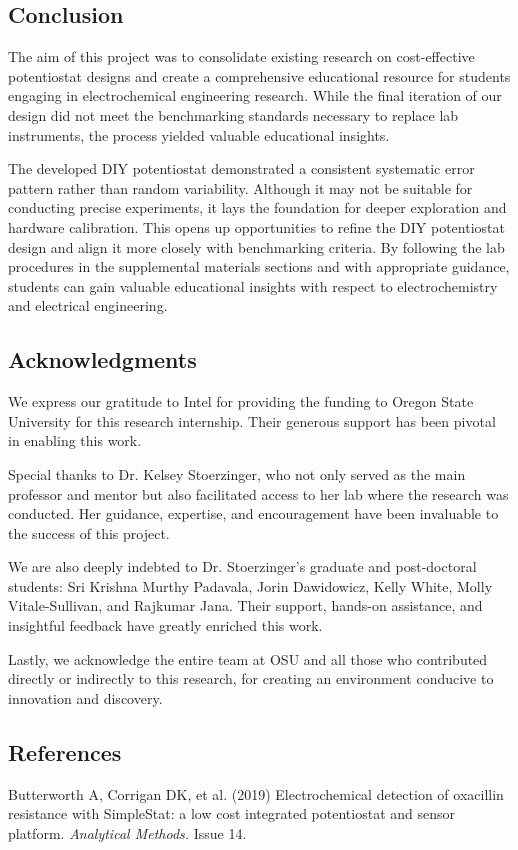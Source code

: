 \documentclass{article}
\begin{document}
\subsection*{Conclusion}
The aim of this project was to consolidate existing research on cost-effective potentiostat designs and create a comprehensive educational resource for students engaging in electrochemical engineering research. While the final iteration of our design did not meet the benchmarking standards necessary to replace lab instruments, the process yielded valuable educational insights.

The developed DIY potentiostat demonstrated a consistent systematic error pattern rather than random variability. Although it may not be suitable for conducting precise experiments, it lays the foundation for deeper exploration and hardware calibration. This opens up opportunities to refine the DIY potentiostat design and align it more closely with benchmarking criteria. By following the lab procedures in the supplemental materials sections and with appropriate guidance, students can gain valuable educational insights with respect to electrochemistry and electrical engineering.


\subsection*{Acknowledgments}

We express our gratitude to Intel for providing the funding to Oregon State University for this research internship. Their generous support has been pivotal in enabling this work.

Special thanks to Dr. Kelsey Stoerzinger, who not only served as the main professor and mentor but also facilitated access to her lab where the research was conducted. Her guidance, expertise, and encouragement have been invaluable to the success of this project.

We are also deeply indebted to Dr. Stoerzinger's graduate and post-doctoral students: Sri Krishna Murthy Padavala, Jorin Dawidowicz, Kelly White, Molly Vitale-Sullivan, and Rajkumar Jana. Their support, hands-on assistance, and insightful feedback have greatly enriched this work.

Lastly, we acknowledge the entire team at OSU and all those who contributed directly or indirectly to this research, for creating an environment conducive to innovation and discovery.

\subsection*{References}
Butterworth A, Corrigan DK, et al. (2019) Electrochemical detection of oxacillin resistance with SimpleStat: a low cost integrated potentiostat and sensor platform. \emph{Analytical Methods.} Issue 14. 
\end{document}

